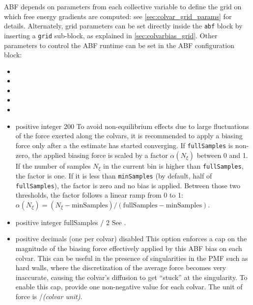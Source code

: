 
ABF depends on parameters from each collective variable to define the grid on which free energy gradients are computed: see \ref{sec:colvar_grid_params} for details.
Alternately, grid parameters can be set directly inside the \texttt{abf} block by inserting a \texttt{grid} sub-block, as explained in \ref{sec:colvarbias_grid}.
Other parameters to control the ABF runtime can be set in the ABF configuration block:

\begin{itemize}

\item {}
\item {}
\item {}
\item {}
\item {}

\item %
  {positive integer}
  {200}
  {To avoid non-equilibrium effects due to large fluctuations of the force exerted along the
   colvars, it is recommended to apply a biasing force only after a the estimate has started
   converging. If \texttt{fullSamples} is non-zero, the applied biasing force is scaled by a factor
   $\alpha(N_\xi)$ between 0 and 1.
   If the number of samples $N_\xi$ in the current bin is higher than \texttt{fullSamples},
   the factor is one. If it is less than \texttt{minSamples} (by default, half of \texttt{fullSamples}),
   the factor is zero and no bias is applied.
   Between those two thresholds, the factor follows a linear ramp from
   0 to 1: $\alpha(N_\xi) = (N_\xi - \mathrm{minSamples}) / (\mathrm{fullSamples} - \mathrm{minSamples})$.}


\item {}
 {positive integer}
 {fullSamples / 2}
 {See .}


\item {}
  {positive decimals (one per colvar)}
  {disabled}
  {This option enforces a cap on the magnitude of the biasing force effectively applied
   by this ABF bias on each colvar. This can be useful in the presence of singularities
   in the PMF such as hard walls, where the discretization of the average force becomes
   very inaccurate, causing the colvar's diffusion to get ``stuck'' at the singularity.
   To enable this cap, provide one non-negative value for each colvar. The unit of force
   is \energyunit/\textit{(colvar unit)}.}


\end{itemize}
